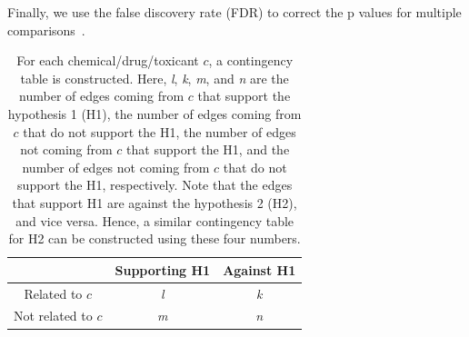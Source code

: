 Finally, we use the false discovery rate (FDR) to correct the p values for multiple comparisons~\cite{Benjamini:1997}.

\begin{table}
\caption{For each chemical/drug/toxicant $c$, a contingency table is constructed. Here, \emph{l}, \emph{k}, \emph{m}, and \emph{n} are the number of edges coming from $c$ that support the hypothesis 1 (H1), the number of edges coming from $c$ that do not support the H1, the number of edges not coming from $c$ that support the H1, and the number of edges not coming from $c$ that do not support the H1, respectively. Note that the edges that support H1 are against the hypothesis 2 (H2), and vice versa. Hence, a similar contingency table for H2 can be constructed using these four numbers.}
\begin{center}
\begin{tabular}{c|cc}
&  Supporting H1& Against H1\\
\hline
Related to $c$& \emph{l} & \emph{k} \\
 Not related to $c$&\emph{m}& \emph{n}  \\
\end{tabular}
\end{center}
\label{ConfusionMatrix}
\end{table}%






%
% 
